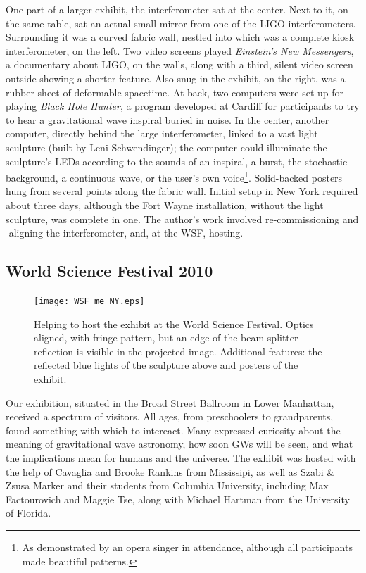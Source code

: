 One part of a larger exhibit, the interferometer sat at the center.
Next to it, on the same table, sat an actual small mirror from one of the LIGO interferometers.
Surrounding it was a curved fabric wall, nestled into which was a complete kiosk interferometer, on the left.
Two video screens played \textit{Einstein's New Messengers}, a documentary about LIGO, on the walls, along with a third, silent video screen outside showing a shorter feature.
Also snug in the exhibit, on the right, was a rubber sheet of deformable spacetime.
At back, two computers were set up for playing \textit{Black Hole Hunter}, a program developed at Cardiff for participants to try to hear a gravitational wave inspiral buried in noise.
In the center, another computer, directly behind the large interferometer, linked to a vast light sculpture (built by Leni Schwendinger); the computer could illuminate the sculpture's LEDs according to the sounds of an inspiral, a burst, the stochastic background, a continuous wave, or the user's own voice\footnote{As demonstrated by an opera singer in attendance, although all participants made beautiful patterns.}.
Solid-backed posters hung from several points along the fabric wall.
Initial setup in New York required about three days, although the Fort Wayne installation, without the light sculpture, was complete in one.
The author's work involved re-commissioning and -aligning the interferometer, and, at the WSF, hosting.

        \subsection{World Science Festival 2010}
        \label{WSF2010}


	\begin{figure}
	\begin{center}
	\texttt{[image: WSF\_me\_NY.eps]}
	\caption{Helping to host the exhibit at the World Science Festival. Optics aligned, with fringe pattern, but an edge of the beam-splitter reflection is visible in the projected image. Additional features: the reflected blue lights of the sculpture above and posters of the exhibit.}
	\label{WSF_IFO_me}
	\end{center}
	\end{figure}

Our exhibition, situated in the Broad Street Ballroom in Lower Manhattan, received a spectrum of visitors.
All ages, from preschoolers to grandparents, found something with which to intereact.
Many expressed curiosity about the meaning of gravitational wave astronomy, how soon GWs will be seen, and what the implications mean for humans and the universe.
The exhibit was hosted with the help of Cavaglia and Brooke Rankins from Mississipi, as well as Szabi \& Zsusa Marker and their students from Columbia University, including Max Factourovich and Maggie Tse, along with Michael Hartman from the University of Florida.


